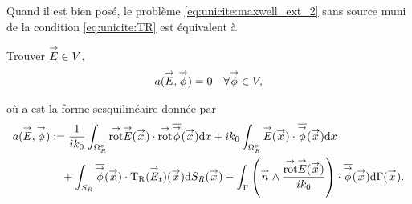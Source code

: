   Quand il est bien posé, le problème \eqref{eq:unicite:maxwell_ext_2} sans source muni de la condition \eqref{eq:unicite:TR} est équivalent à
  \begin{prop}
    Trouver \(\vE \in V\),
    \begin{align*}
      a(\vE,\vect\phi) = 0 && \forall \vect \phi \in V,
    \end{align*}

    où a est la forme sesquilinéaire donnée par
    \begin{equation*}
      \begin{aligned}
      a(\vE,\vect\phi) &:=  \frac{1}{ik_0} \int_{\OO^c_R} \trot \vE(\vx) \cdot \trot \conj{\vect{\phi}}(\vx) \dd{x} + ik_0\int_{\OO^c_R}\vE(\vx)\cdot\conj{\vect{\phi}}(\vx) \dd{x}
        \\ 
        & \quad + \int_{S_R} \conj{ \vect \phi }(\vx) \cdot \Tr(\vE_t)(\vx) \dd{S_R}(\vx) - \int_\Gamma \left(\vn \pvect \frac{\trot \vE(\vx)}{ik_0}\right) \cdot \conj{\vect \phi} (\vx) \dd{\Gamma}(\vx).
      \end{aligned}
    \end{equation*}
  \end{prop}
